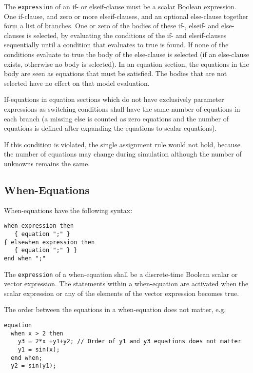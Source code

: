 The \lstinline!expression! of an if- or elseif-clause must be a scalar Boolean
expression. One if-clause, and zero or more elseif-clauses, and an
optional else-clause together form a list of branches. One or zero of
the bodies of these if-, elseif- and else-clauses is selected, by
evaluating the conditions of the if- and elseif-clauses sequentially
until a condition that evaluates to true is found. If none of the
conditions evaluate to true the body of the else-clause is selected (if
an else-clause exists, otherwise no body is selected). In an equation
section, the equations in the body are seen as equations that must be
satisfied. The bodies that are not selected have no effect on that model
evaluation.

If-equations in equation sections which do not have exclusively
parameter expressions as switching conditions shall have the same number
of equations in each branch (a missing else is counted as zero equations
and the number of equations is defined after expanding the equations to
scalar equations).

\begin{nonnormative}
If this condition is violated, the single assignment rule would not hold, because the number of equations may change during simulation
although the number of unknowns remains the same.
\end{nonnormative}

\subsection{When-Equations}

When-equations have the following syntax:
\begin{lstlisting}[language=grammar]
when expression then
   { equation ";" }
{ elsewhen expression then
   { equation ";" } }
end when ";"
\end{lstlisting}

The \lstinline!expression! of a when-equation shall be a discrete-time Boolean
scalar or vector expression. The statements within a when-equation are
activated when the scalar expression or any of the elements of the
vector expression becomes true.

\begin{example}
The order between the equations in a when-equation does not matter, e.g.
\begin{lstlisting}[language=modelica]
equation
  when x > 2 then
    y3 = 2*x +y1+y2; // Order of y1 and y3 equations does not matter
    y1 = sin(x);
  end when;
  y2 = sin(y1);
\end{lstlisting}
\end{example}

